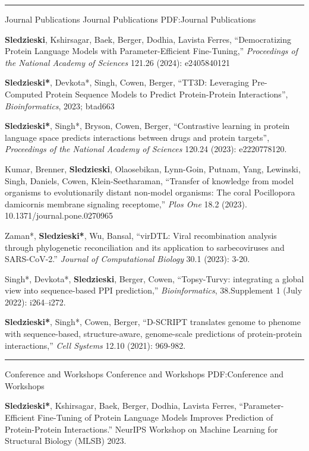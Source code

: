 \documentclass[letterpaper,MMMyyyy,nonstopmode]{simpleresumecv}
\begin{document}
\begin{Body}
\BigGap
\hrule
\Section
{Journal Publications}
{Journal Publications}
{PDF:Journal Publications}

\Gap
\NumberedItem{[7]}
{\textbf{Sledzieski}, Kshirsagar, Baek, Berger, Dodhia, Lavista Ferres,
``Democratizing Protein Language Models with Parameter-Efficient Fine-Tuning,'' \textit{Proceedings of the National Academy of Sciences} 121.26 (2024): e2405840121}

\Gap
\NumberedItem{[6]}
{\textbf{Sledzieski*}, Devkota*, Singh, Cowen, Berger,
``TT3D: Leveraging Pre-Computed Protein Sequence Models to Predict Protein-Protein Interactions'', \textit{Bioinformatics}, 2023; btad663 }

\Gap
\NumberedItem{[5]}
{\textbf{Sledzieski*}, Singh*, Bryson, Cowen, Berger, ``Contrastive learning in protein language space predicts interactions between drugs and protein targets'', \textit{Proceedings of the National Academy of Sciences} 120.24 (2023): e2220778120.}

\Gap
\NumberedItem{[4]}
{Kumar, Brenner, \textbf{Sledzieski}, Olaosebikan, Lynn-Goin, Putnam, Yang, Lewinski, Singh, Daniels, Cowen, Klein-Seetharaman, ``Transfer of knowledge from model organisms to evolutionarily distant non-model organisms: The coral Pocillopora damicornis membrane signaling receptome,'' \textit{Plos One} 18.2 (2023). 10.1371/journal.pone.0270965
}

\Gap
\NumberedItem{[3]}
{Zaman*, \textbf{Sledzieski*}, Wu, Bansal,
``virDTL: Viral recombination analysis through phylogenetic reconciliation and its application to sarbecoviruses and SARS-CoV-2.'' \textit{Journal of Computational Biology} 30.1 (2023): 3-20.}

\Gap
\NumberedItem{[2]}
{Singh*, Devkota*, \textbf{Sledzieski}, Berger, Cowen, ``Topsy-Turvy: integrating a global view into sequence-based PPI prediction,'' \textit{Bioinformatics}, 38.Supplement 1 (July 2022): i264–i272.}


\Gap
\NumberedItem{[1]}
{\textbf{Sledzieski*}, Singh*, Cowen, Berger,
``D-SCRIPT translates genome to phenome with sequence-based, structure-aware, genome-scale predictions of protein-protein interactions,''
\textit{Cell Systems} 12.10 (2021): 969-982.}

\BigGap
\hrule
\Section
{Conference and Workshops}
{Conference and Workshops}
{PDF:Conference and Workshops}

\Gap
\NumberedItem{[5]}
{\textbf{Sledzieski*}, Kshirsagar, Baek, Berger, Dodhia, Lavista Ferres,
``Parameter-Efficient Fine-Tuning of Protein Language Models Improves Prediction of Protein-Protein Interactions.'' NeurIPS Workshop on Machine Learning for Structural Biology (MLSB) 2023.}


\end{Body}
\end{document}
